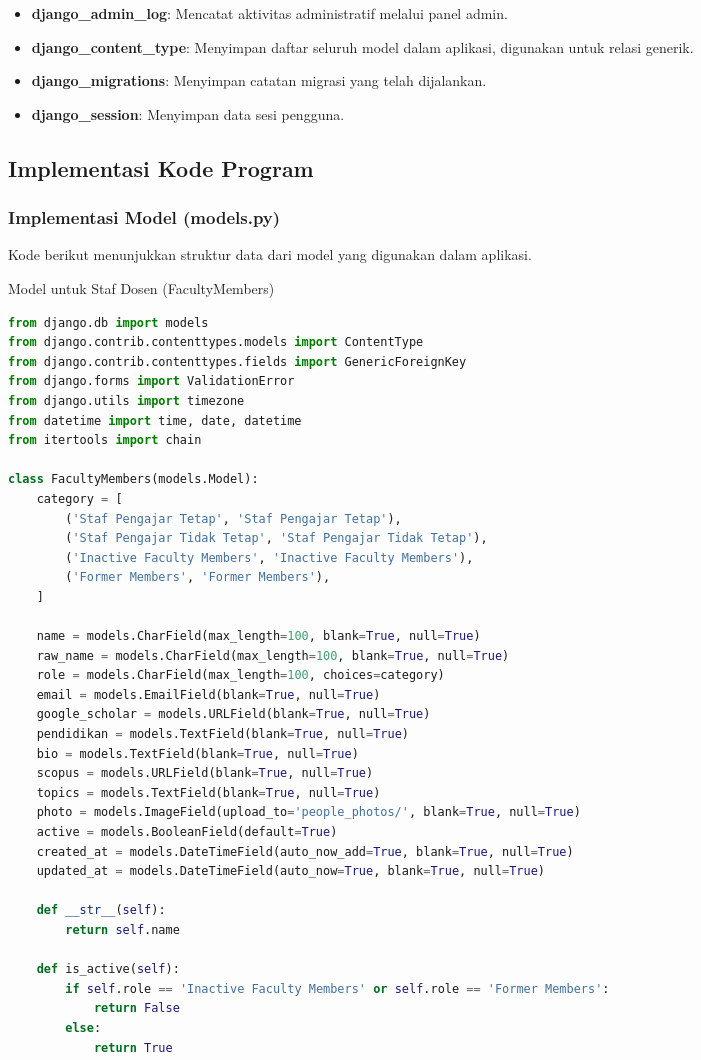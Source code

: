 \begin{itemize}
    \item \textbf{django\_admin\_log}: Mencatat aktivitas administratif melalui panel admin.
    \item \textbf{django\_content\_type}: Menyimpan daftar seluruh model dalam aplikasi, digunakan untuk relasi generik.
    \item \textbf{django\_migrations}: Menyimpan catatan migrasi yang telah dijalankan.
    \item \textbf{django\_session}: Menyimpan data sesi pengguna.
\end{itemize}

\subsection{Implementasi Kode Program}
\subsubsection{Implementasi Model (models.py)}

Kode berikut menunjukkan struktur data dari model yang digunakan dalam aplikasi.

\begin{listing}[H]
\caption{Model untuk Staf Dosen (FacultyMembers)}
\label{lst:faculty_members}
\begin{lstlisting}[language=Python]
from django.db import models
from django.contrib.contenttypes.models import ContentType
from django.contrib.contenttypes.fields import GenericForeignKey
from django.forms import ValidationError
from django.utils import timezone
from datetime import time, date, datetime
from itertools import chain

class FacultyMembers(models.Model):
    category = [
        ('Staf Pengajar Tetap', 'Staf Pengajar Tetap'),
        ('Staf Pengajar Tidak Tetap', 'Staf Pengajar Tidak Tetap'),
        ('Inactive Faculty Members', 'Inactive Faculty Members'),
        ('Former Members', 'Former Members'),
    ]

    name = models.CharField(max_length=100, blank=True, null=True)
    raw_name = models.CharField(max_length=100, blank=True, null=True)
    role = models.CharField(max_length=100, choices=category)
    email = models.EmailField(blank=True, null=True)
    google_scholar = models.URLField(blank=True, null=True)
    pendidikan = models.TextField(blank=True, null=True)
    bio = models.TextField(blank=True, null=True)
    scopus = models.URLField(blank=True, null=True)
    topics = models.TextField(blank=True, null=True)
    photo = models.ImageField(upload_to='people_photos/', blank=True, null=True)
    active = models.BooleanField(default=True)
    created_at = models.DateTimeField(auto_now_add=True, blank=True, null=True)
    updated_at = models.DateTimeField(auto_now=True, blank=True, null=True)

    def __str__(self):
        return self.name

    def is_active(self):
        if self.role == 'Inactive Faculty Members' or self.role == 'Former Members':
            return False
        else:
            return True
\end{lstlisting}
\end{listing}

